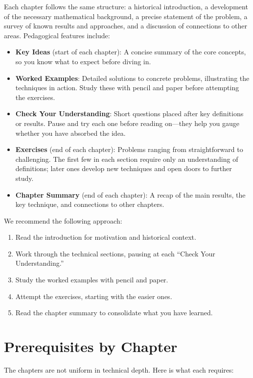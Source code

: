 \documentclass[11pt,a4paper]{book}
\theoremstyle{definition}
\begin{document}
Each chapter follows the same structure: a historical introduction, a development of the necessary mathematical background, a precise statement of the problem, a survey of known results and approaches, and a discussion of connections to other areas. Pedagogical features include:

\begin{itemize}
  \item \textbf{Key Ideas} (start of each chapter): A concise summary of the core concepts, so you know what to expect before diving in.
  \item \textbf{Worked Examples}: Detailed solutions to concrete problems, illustrating the techniques in action. Study these with pencil and paper before attempting the exercises.
  \item \textbf{Check Your Understanding}: Short questions placed after key definitions or results. Pause and try each one before reading on---they help you gauge whether you have absorbed the idea.
  \item \textbf{Exercises} (end of each chapter): Problems ranging from straightforward to challenging. The first few in each section require only an understanding of definitions; later ones develop new techniques and open doors to further study.
  \item \textbf{Chapter Summary} (end of each chapter): A recap of the main results, the key technique, and connections to other chapters.
\end{itemize}

We recommend the following approach:
\begin{enumerate}
  \item Read the introduction for motivation and historical context.
  \item Work through the technical sections, pausing at each ``Check Your Understanding.''
  \item Study the worked examples with pencil and paper.
  \item Attempt the exercises, starting with the easier ones.
  \item Read the chapter summary to consolidate what you have learned.
\end{enumerate}

\section*{Prerequisites by Chapter}

The chapters are not uniform in technical depth. Here is what each requires:
\end{document}
